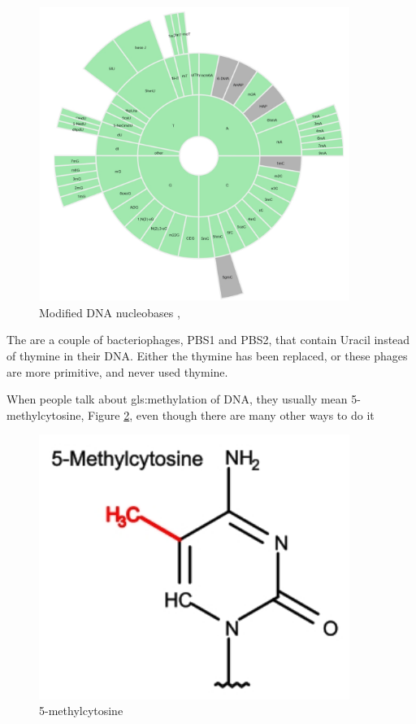 \documentclass[]{article}
\begin{document}
\begin{figure}[H]
	\caption[Modified DNA nucleobases]{Modified DNA nucleobases \cite{sood2019dnamod},\cite{sood2019dnamod_website}} \label{fig:ModifiedDNA_Nucleobases} 
	\includegraphics[width=0.9\textwidth]{ModifiedDNA_Nucleobases}
\end{figure}

The are a couple of bacteriophages, PBS1 and PBS2, that contain Uracil instead of thymine in their DNA\cite{hemphill1975bacteriophages}. Either the thymine has been replaced, or these phages are more primitive, and never used thymine.

When people talk about \gls{gls:methylation} of DNA, they usually mean 5-methylcytosine, Figure \ref{fig:5methylcytosine}, even though there are many other ways to do it
\begin{figure}[H]
	\caption{5-methylcytosine } \label{fig:5methylcytosine} 
	\includegraphics[width=0.9\textwidth]{5-methylcytosine}
\end{figure}
\end{document}

